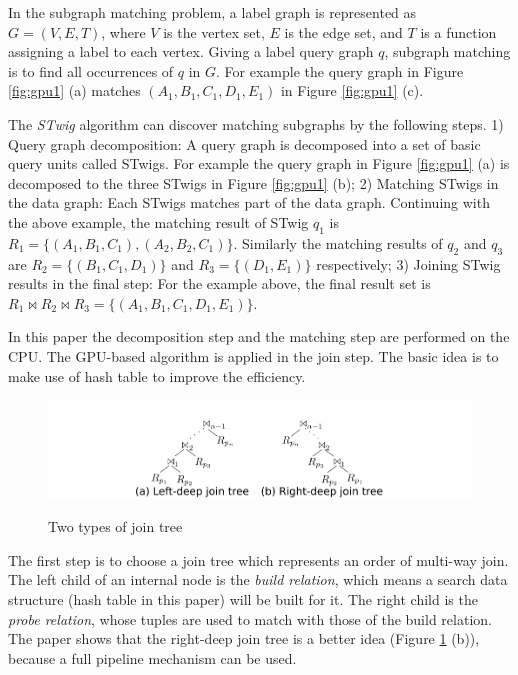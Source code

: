 \documentclass[paper=a4, fontsize=18pt]{article} %
\numberwithin{equation}{section} %
\numberwithin{figure}{section} %
\numberwithin{table}{section} %
\begin{document}
In the subgraph matching problem, a label graph is represented as $G = (V,E,T)$, where $V$ is the vertex set, $E$ is the edge set, and $T$ is a function assigning a label to each vertex. Giving a label query graph $q$, subgraph matching is to find all occurrences of $q$ in $G$. For example the query graph in Figure \ref{fig:gpu1} (a) matches $(A_1, B_1, C_1, D_1, E_1)$ in Figure \ref{fig:gpu1} (c).

The \emph{STwig} algorithm \cite{SWWSL12} can discover matching subgraphs by the following steps. 1) Query graph decomposition: A query graph is decomposed into a set of basic query units called STwigs. For example the query graph in Figure \ref{fig:gpu1} (a) is decomposed to the three STwigs in Figure \ref{fig:gpu1} (b); 2) Matching STwigs in the data graph: Each STwigs matches part of the data graph. Continuing with the above example, the matching result of STwig $q_1$ is $R_1 = \{(A_1, B_1, C_1), (A_2, B_2, C_1)\}$. Similarly the matching results of $q_2$ and $q_3$ are $R_2 = \{(B_1, C_1, D_1)\}$ and $R_3 = \{(D_1, E_1)\}$ respectively; 3) Joining STwig results in the final step: For the example above, the final result set is $R_1\bowtie R_2 \bowtie R_3 =\{(A_1, B_1, C_1, D_1, E_1)\}$.

In this paper the decomposition step and the matching step are performed on the CPU. The GPU-based algorithm is applied in the join step. The basic idea is to make use of hash table to improve  the efficiency.

\begin{figure}[h]
  \centering
  \includegraphics[width=.9\linewidth]{8_1_gpu2.png}\\
  \caption{Two types of join tree}\label{fig:gpu2}
\end{figure}

The first step is to choose a join tree which represents an order of multi-way join. The left child of an internal node is the \emph{build relation}, which means a search data structure (hash table in this paper) will be built for it. The right child is the \emph{probe relation}, whose tuples are used to match with those of the build relation. The paper shows that the right-deep join tree is a better idea (Figure \ref{fig:gpu2} (b)), because a full pipeline mechanism can be used.
\end{document}
